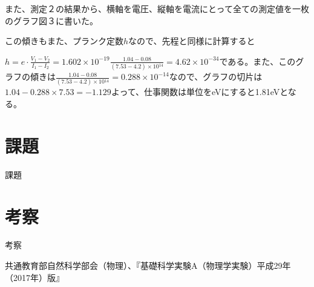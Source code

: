 \documentclass{jsarticle}
\begin{document}
また、測定２の結果から、横軸を電圧、縦軸を電流にとって全ての測定値を一枚のグラフ図３に書いた。

この傾きもまた、プランク定数$h$なので、先程と同様に計算すると
\par $h = e\cdot\frac{V_1-V_2}{I_1-I_2} = 1.602\times 10^{-19} \frac{1.04-0.08}{(7.53-4.2)\times 10{^14}} = 4.62\times 10^{-34}$である。また、このグラフの傾きは$\frac{1.04-0.08}{(7.53-4.2)\times 10{^14}} = 0.288\times 10^{-14}$なので、グラフの切片は$1.04 - 0.288\times 7.53 = -1.129$よって、仕事関数は単位をeVにすると1.81eVとなる。

\section{課題}

課題

\section{考察}

考察






\begin{thebibliography}{99}
     共通教育部自然科学部会（物理）、『基礎科学実験A（物理学実験）平成29年（2017年）版』
\end{thebibliography}
\end{document}
